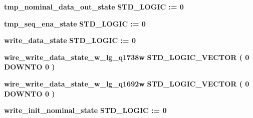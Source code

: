 \begin{DoxyCompactItemize}
\item 
{\bf tmp\+\_\+nominal\+\_\+data\+\_\+out\+\_\+state} {\bfseries \textcolor{comment}{S\+T\+D\+\_\+\+L\+O\+G\+IC}\textcolor{vhdlchar}{ }\textcolor{vhdlchar}{ }\textcolor{vhdlchar}{\+:}\textcolor{vhdlchar}{=}\textcolor{vhdlchar}{ }\textcolor{vhdlchar}{ }\textcolor{vhdlchar}{\textquotesingle{}}\textcolor{vhdlchar}{ } \textcolor{vhdldigit}{0} \textcolor{vhdlchar}{ }\textcolor{vhdlchar}{\textquotesingle{}}\textcolor{vhdlchar}{ }} 
\item 
{\bf tmp\+\_\+seq\+\_\+ena\+\_\+state} {\bfseries \textcolor{comment}{S\+T\+D\+\_\+\+L\+O\+G\+IC}\textcolor{vhdlchar}{ }\textcolor{vhdlchar}{ }\textcolor{vhdlchar}{\+:}\textcolor{vhdlchar}{=}\textcolor{vhdlchar}{ }\textcolor{vhdlchar}{ }\textcolor{vhdlchar}{\textquotesingle{}}\textcolor{vhdlchar}{ } \textcolor{vhdldigit}{0} \textcolor{vhdlchar}{ }\textcolor{vhdlchar}{\textquotesingle{}}\textcolor{vhdlchar}{ }} 
\item 
{\bf write\+\_\+data\+\_\+state} {\bfseries \textcolor{comment}{S\+T\+D\+\_\+\+L\+O\+G\+IC}\textcolor{vhdlchar}{ }\textcolor{vhdlchar}{ }\textcolor{vhdlchar}{\+:}\textcolor{vhdlchar}{=}\textcolor{vhdlchar}{ }\textcolor{vhdlchar}{ }\textcolor{vhdlchar}{\textquotesingle{}}\textcolor{vhdlchar}{ } \textcolor{vhdldigit}{0} \textcolor{vhdlchar}{ }\textcolor{vhdlchar}{\textquotesingle{}}\textcolor{vhdlchar}{ }} 
\item 
{\bf wire\+\_\+write\+\_\+data\+\_\+state\+\_\+w\+\_\+lg\+\_\+q1738w} {\bfseries \textcolor{comment}{S\+T\+D\+\_\+\+L\+O\+G\+I\+C\+\_\+\+V\+E\+C\+T\+OR}\textcolor{vhdlchar}{ }\textcolor{vhdlchar}{(}\textcolor{vhdlchar}{ }\textcolor{vhdlchar}{ } \textcolor{vhdldigit}{0} \textcolor{vhdlchar}{ }\textcolor{keywordflow}{D\+O\+W\+N\+TO}\textcolor{vhdlchar}{ }\textcolor{vhdlchar}{ } \textcolor{vhdldigit}{0} \textcolor{vhdlchar}{ }\textcolor{vhdlchar}{)}\textcolor{vhdlchar}{ }} 
\item 
{\bf wire\+\_\+write\+\_\+data\+\_\+state\+\_\+w\+\_\+lg\+\_\+q1692w} {\bfseries \textcolor{comment}{S\+T\+D\+\_\+\+L\+O\+G\+I\+C\+\_\+\+V\+E\+C\+T\+OR}\textcolor{vhdlchar}{ }\textcolor{vhdlchar}{(}\textcolor{vhdlchar}{ }\textcolor{vhdlchar}{ } \textcolor{vhdldigit}{0} \textcolor{vhdlchar}{ }\textcolor{keywordflow}{D\+O\+W\+N\+TO}\textcolor{vhdlchar}{ }\textcolor{vhdlchar}{ } \textcolor{vhdldigit}{0} \textcolor{vhdlchar}{ }\textcolor{vhdlchar}{)}\textcolor{vhdlchar}{ }} 
\item 
{\bf write\+\_\+init\+\_\+nominal\+\_\+state} {\bfseries \textcolor{comment}{S\+T\+D\+\_\+\+L\+O\+G\+IC}\textcolor{vhdlchar}{ }\textcolor{vhdlchar}{ }\textcolor{vhdlchar}{\+:}\textcolor{vhdlchar}{=}\textcolor{vhdlchar}{ }\textcolor{vhdlchar}{ }\textcolor{vhdlchar}{\textquotesingle{}}\textcolor{vhdlchar}{ } \textcolor{vhdldigit}{0} \textcolor{vhdlchar}{ }\textcolor{vhdlchar}{\textquotesingle{}}\textcolor{vhdlchar}{ }} 

\end{DoxyCompactItemize}
